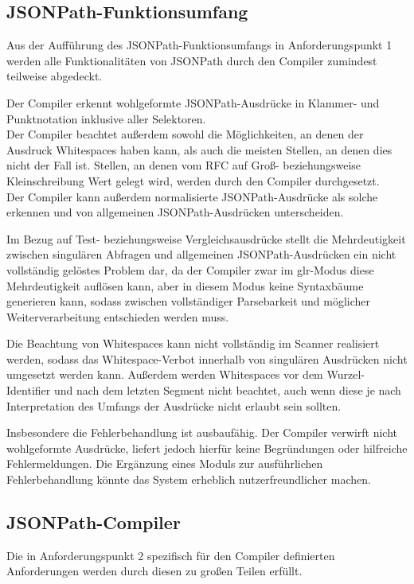 \documentclass[oneside]{ausarbeitung}
\begin{document}
	\subsection{JSONPath-Funktionsumfang}
	Aus der Aufführung des JSONPath-Funktionsumfangs in Anforderungspunkt 1 werden alle Funktionalitäten von JSONPath durch den Compiler zumindest teilweise abgedeckt. 
	
	Der Compiler erkennt wohlgeformte JSONPath-Ausdrücke in Klammer- und Punktnotation inklusive aller Selektoren. \\
	Der Compiler beachtet außerdem sowohl die Möglichkeiten, an denen der Ausdruck Whitespaces haben kann, als auch die meisten Stellen, an denen dies nicht der Fall ist. Stellen, an denen vom RFC auf Groß- beziehungsweise Kleinschreibung Wert gelegt wird, werden durch den Compiler durchgesetzt. \\
	Der Compiler kann außerdem normalisierte JSONPath-Ausdrücke als solche erkennen und von allgemeinen JSONPath-Ausdrücken unterscheiden.
	
	Im Bezug auf Test- beziehungsweise Vergleichsausdrücke stellt die Mehrdeutigkeit zwischen singulären Abfragen und allgemeinen JSONPath-Ausdrücken ein nicht vollständig gelöstes Problem dar, da der Compiler zwar im \ac{glr}-Modus diese Mehrdeutigkeit auflösen kann, aber in diesem Modus keine Syntaxbäume generieren kann, sodass zwischen vollständiger Parsebarkeit und möglicher Weiterverarbeitung entschieden werden muss.

\pagebreak

	Die Beachtung von Whitespaces kann nicht vollständig im Scanner realisiert werden, sodass das Whitespace-Verbot innerhalb von singulären Ausdrücken nicht umgesetzt werden kann. Außerdem werden Whitespaces vor dem Wurzel-Identifier und nach dem letzten Segment nicht beachtet, auch wenn diese je nach Interpretation des Umfangs der Ausdrücke nicht erlaubt sein sollten.
	
	Insbesondere die Fehlerbehandlung ist ausbaufähig. Der Compiler verwirft nicht wohlgeformte Ausdrücke, liefert jedoch hierfür keine Begründungen oder hilfreiche Fehlermeldungen. Die Ergänzung eines Moduls zur ausführlichen Fehlerbehandlung könnte das System erheblich nutzerfreundlicher machen.
	

\subsection{JSONPath-Compiler}

Die in Anforderungspunkt 2 spezifisch für den Compiler definierten Anforderungen werden durch diesen zu großen Teilen erfüllt. 
\end{document}
